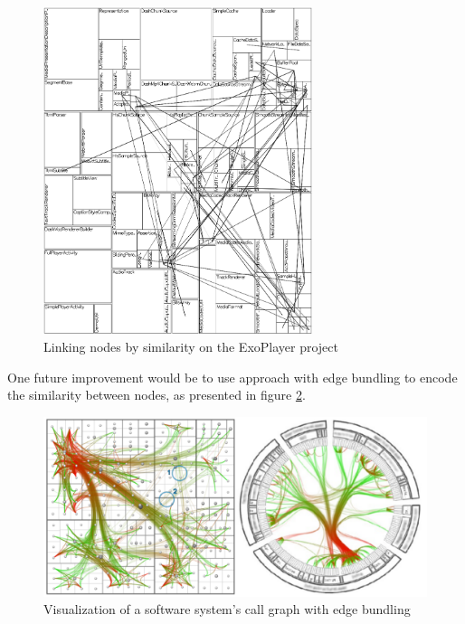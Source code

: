 \begin{figure}[H]
  \centering
  \includegraphics[width=0.7\textwidth]{figures/treemap_similarity.png}
  \caption{Linking nodes by similarity on the ExoPlayer project}
  \label{fig:treemap_similarity}
\end{figure}

One future improvement would be to use \citet{ref:holten06} approach with edge bundling to encode the similarity between nodes, as presented in figure \ref{fig:holten}.

\begin{figure}[H]
  \centering
  \includegraphics[width=1.0\textwidth]{figures/holten.png}
  \caption{Visualization of a software system's call graph with edge bundling}
  \label{fig:holten}
\end{figure}
